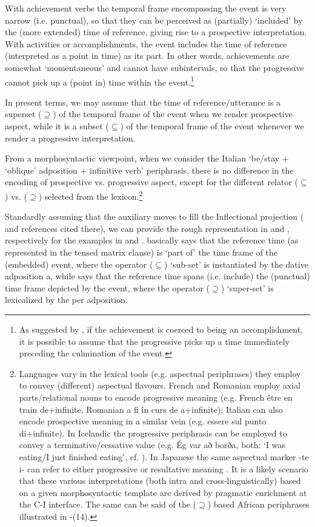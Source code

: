 \documentclass[output=paper,modfonts,nonflat,newtxmath,colorlinks,citecolor=brown]{langsci/langscibook}
\begin{document}
With achievement verbs the temporal frame encompassing the event is very narrow (i.e. punctual), so that they can be perceived as (partially) ‘included’ by the (more extended) time of reference, giving rise to a prospective interpretation. With activities or accomplishments, the event includes the time of reference (interpreted as a point in time) as its part. In other words, achievements are somewhat ‘momentaneous’ and cannot have subintervals, so that the progressive cannot pick up a (point in) time within the event.\footnote{As suggested by \citet{Rothstein2004}, if the achievement is coerced to being an accomplishment, it is possible to assume that the progressive picks up a time immediately preceding the culmination of the event.} 

In present terms, we may assume that the time of reference/utterance is a superset (${\supseteq}$) of the temporal frame of the event when we render prospective aspect, while it is a subset (${\subseteq}$) of the temporal frame of the event whenever we render a progressive interpretation.

From a morphosyntactic viewpoint, when we consider the Italian ‘be/stay + ‘oblique’ adposition + infinitive verb’ periphrasis, there is no difference in the encoding of prospective {vs}. progressive aspect, except for the different relator  (${\subseteq}$) {vs}. (${\supseteq}$) selected from the lexicon.\footnote{Languages vary in the lexical tools (e.g. aspectual periphrases) they employ to convey (different) aspectual flavours. French and Romanian employ axial parts/relational nouns \citep{Svenonius2006axial} to encode progressive meaning (e.g. French {être en train de}+infinite, Romanian {a fi în curs de a}+infinite); Italian can also encode prospective meaning in a similar vein (e.g. {essere sul punto di+}infinite).  In Icelandic the progressive periphrasis can be employed to convey a terminative/cessative value (e.g. {Ég var að borða,} both: ‘I was eating/I just finished eating’, cf. \citealt{Johannsdottir2011}). In Japanese the same aspectual marker {{}-te i-} can refer to either progressive or resultative meaning \citep{Shirai1998}. It is a likely scenario that these various interpretations (both intra and cross-linguistically) based on a given morphosyntactic template are derived by pragmatic enrichment at the C-I interface. The same can be said of the (\textrm{${\supseteq}$}) based African periphrases illustrated in -(14).} 

Standardly assuming that the auxiliary moves to fill the Inflectional projection (\citealt{ManziniLorussoSavoia2017} and references cited there), we can provide the rough representation in  and , respectively for the examples in  and .  basically says that the reference time (as represented in the tensed matrix clause) is ‘part of’ the time frame of the (embedded) event, where the operator (${\subseteq}$) ‘sub-set’  is instantiated by the dative adposition {a}, while  says that the reference time spans (i.e. include) the (punctual) time frame depicted by the event, where the operator (${\supseteq}$) ‘super-set’ is lexicalized by the {per} adposition.
\end{document}
